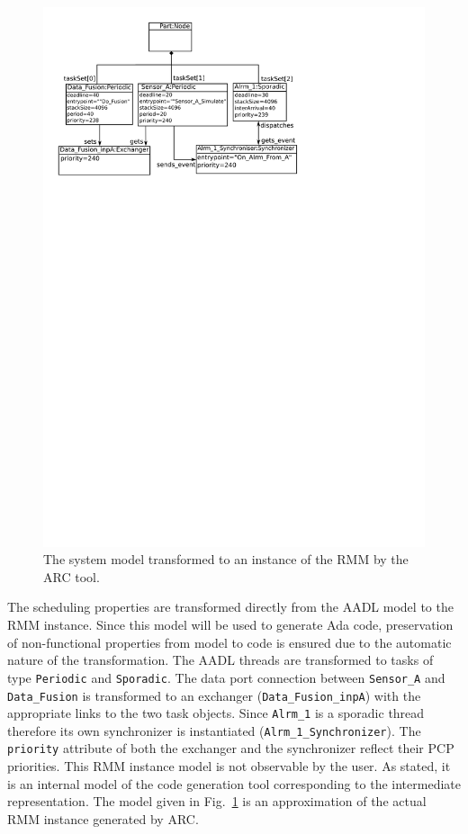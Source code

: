 \begin{figure}
\centering
\includegraphics[scale=0.70]{figs/rmm_inst}
\caption{The system model transformed to an instance of the RMM by the
  ARC tool.}
\label{fig:rmm_inst}
\end{figure}

The scheduling properties are transformed directly from the AADL model
to the RMM instance. Since this model will be used to generate Ada
code, preservation of non-functional properties from model to code is
ensured due to the automatic nature of the transformation. The AADL
threads are transformed to tasks of type \texttt{Periodic} and
\texttt{Sporadic}. The data port connection between \texttt{Sensor\_A}
and \texttt{Data\_Fusion} is transformed to an exchanger
(\texttt{Data\_Fusion\_inpA}) with the appropriate links to the two
task objects. Since \texttt{Alrm\_1} is a sporadic thread therefore
its own synchronizer is instantiated
(\texttt{Alrm\_1\_Synchronizer}). The \texttt{priority} attribute of
both the exchanger and the synchronizer reflect their PCP
priorities. This RMM instance model is not observable by the user. As
stated, it is an internal model of the code generation tool
corresponding to the intermediate representation. The model given in
Fig.~\ref{fig:rmm_inst} is an approximation of the actual RMM instance
generated by ARC.

